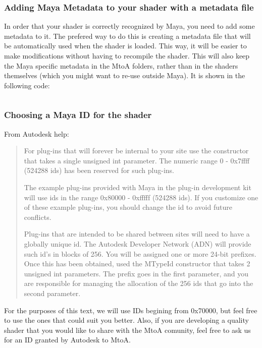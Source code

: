 \subsubsection{Adding Maya Metadata to your shader with a metadata file}
In order that your shader is correctly recognized by Maya, you need to add some metadata to it.
The prefered way to do this is creating a metadata file that will be automatically used when the shader is loaded.
This way, it will be easier to make modifications without having to recompile the shader.
This will also keep the Maya specific metadata in the MtoA folders, rather than in the shaders themselves (which you might want to re-use outside Maya).
It is shown in the following code:

\inputminted[mathescape,
linenos,
numbersep=5pt,
frame=lines,
framesep=2mm,
baselinestretch=1,
fontsize=\footnotesize,
tabsize=3,
label=simpleShader.mtd]
{mtd}{simpleShader.mtd}


\subsubsection{Choosing a Maya ID for the shader}

From Autodesk help:

\begin{quotation}
For plug-ins that will forever be internal to your site use the
constructor that takes a single unsigned int parameter. The numeric
range 0 - 0x7ffff (524288 ids) has been reserved for such plug-ins.

The example plug-ins provided with Maya in the plug-in development kit
will use ids in the range 0x80000 - 0xfffff (524288 ids). If you
customize one of these example plug-ins, you should change the id to
avoid future conflicts.

Plug-ins that are intended to be shared between sites will need to
have a globally unique id. The Autodesk Developer Network (ADN) will
provide such id's in blocks of 256. You will be assigned one or more
24-bit prefixes. Once this has been obtained, used the MTypeId
constructor that takes 2 unsigned int parameters. The prefix goes in
the first parameter, and you are responsible for managing the
allocation of the 256 ids that go into the second parameter.
\end{quotation}

For the purposes of this text, we will use IDs begining from 0x70000, but feel free to use the ones that could suit you better.
Also, if you are developing a quality shader that you would like to share with the MtoA comunity, feel free to ask us for an ID granted by Autodesk to MtoA.

